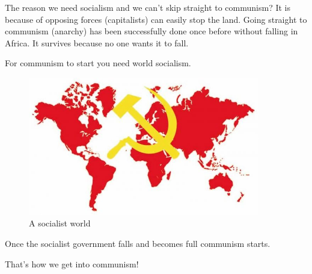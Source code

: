 \documentclass[a4paper]{book} %
\begin{document}
The reason we need socialism and we can't skip straight to communism? It is because of opposing forces (capitalists) can easily stop the land. Going straight to communism (anarchy) has been successfully done once before without falling in Africa. It survives because no one wants it to fall.

For communism to start you need world socialism.

\begin{figure}[tbhp]
\centering
\includegraphics[width=0.9\textwidth]{3-3.jpg}
\caption{A socialist world}
\end{figure}

Once the socialist government falls and becomes full communism starts.

That's how we get into communism!
\end{document}
